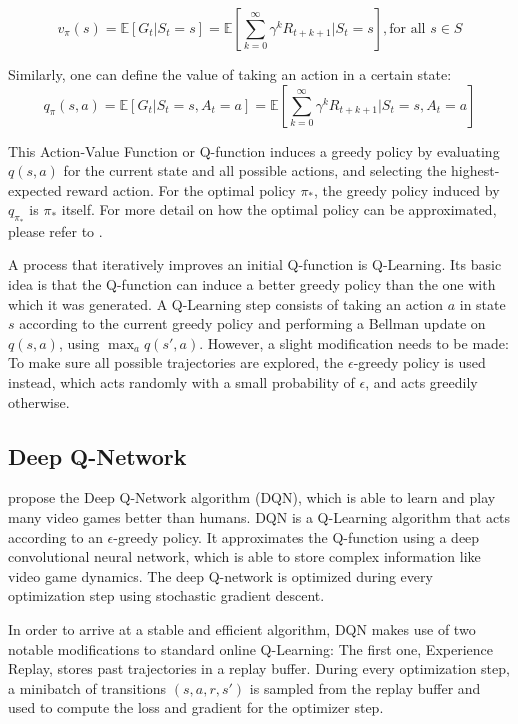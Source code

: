 $$v_\pi(s) = \mathbb{E}[G_t | S_t=s] = \mathbb{E}[\sum_{k=0}^{\infty}\gamma^kR_{t+k+1} | S_t = s], \text{for all } s \in S$$

Similarly, one can define the value of taking an action in a certain state:
$$ q_\pi(s,a) = \mathbb{E}[G_t | S_t=s, A_t = a] = \mathbb{E}[\sum_{k=0}^{\infty}\gamma^kR_{t+k+1} | S_t = s, A_t = a]$$

This Action-Value Function or Q-function induces a greedy policy by evaluating $q(s,a)$ for the current state and all possible actions, and selecting the highest-expected reward action.
For the optimal policy $\pi_*$, the greedy policy induced by $q_{\pi_*}$ is $\pi_*$ itself.
For more detail on how the optimal policy can be approximated, please refer to \cite{sutton2018ReinforcementLearningIntroduction}.

A process that iteratively improves an initial Q-function is Q-Learning.
Its basic idea is that the Q-function can induce a better greedy policy than the one with which it was generated.
A Q-Learning step consists of taking an action $a$ in state $s$ according to the current greedy policy and performing a Bellman update on $q(s,a)$, using $\max_a{q(s',a)}$.
However, a slight modification needs to be made: To make sure all possible trajectories are explored, the $\epsilon$-greedy policy is used instead, which acts randomly with a small probability of $\epsilon$, and acts greedily otherwise.


\subsection{Deep Q-Network}
\cite{mnih2015HumanlevelControlDeep} propose the Deep Q-Network algorithm (DQN), which is able to learn and play many video games better than humans.
DQN is a Q-Learning algorithm that acts according to an $\epsilon$-greedy policy.
It approximates the Q-function using a deep convolutional neural network, which is able to store complex information like video game dynamics.
The deep Q-network is optimized during every optimization step using stochastic gradient descent.

In order to arrive at a stable and efficient algorithm, DQN makes use of two notable modifications to standard online Q-Learning:
The first one, Experience Replay, stores past trajectories in a replay buffer.
During every optimization step, a minibatch of transitions $(s, a, r, s')$ is sampled from the replay buffer and used to compute the loss and gradient for the optimizer step.

